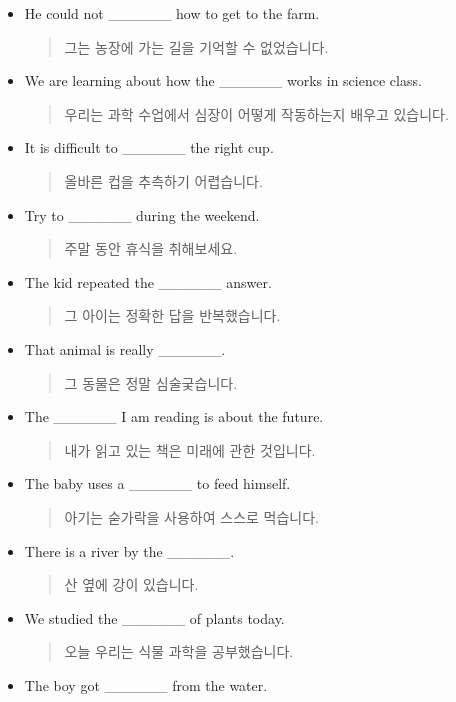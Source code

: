 \documentclass{article}
\begin{document}
\begin{addmargin}[1em]{1em}
\begin{itemize}
\begin{quote}
    \end{quote}
    \item He could not \_\_\_\_\_\_ how to get to the farm.
    \begin{quote}
    그는 농장에 가는 길을 기억할 수 없었습니다.
    \end{quote}
    \newpage
    \item We are learning about how the \_\_\_\_\_\_ works in science class.
    \begin{quote}
    우리는 과학 수업에서 심장이 어떻게 작동하는지 배우고 있습니다.
    \end{quote}
    \item It is difficult to \_\_\_\_\_\_ the right cup.
    \begin{quote}
    올바른 컵을 추측하기 어렵습니다.
    \end{quote}
    \item Try to \_\_\_\_\_\_ during the weekend.
    \begin{quote}
    주말 동안 휴식을 취해보세요.
    \end{quote}
    \item The kid repeated the \_\_\_\_\_\_ answer.
    \begin{quote}
    그 아이는 정확한 답을 반복했습니다.
    \end{quote}
    \item That animal is really \_\_\_\_\_\_.
    \begin{quote}
    그 동물은 정말 심술궂습니다.
    \end{quote}
    \item The \_\_\_\_\_\_ I am reading is about the future.
    \begin{quote}
    내가 읽고 있는 책은 미래에 관한 것입니다.
    \end{quote}
    \item The baby uses a \_\_\_\_\_\_ to feed himself.
    \begin{quote}
    아기는 숟가락을 사용하여 스스로 먹습니다.
    \end{quote}
    \item There is a river by the \_\_\_\_\_\_.
    \begin{quote}
    산 옆에 강이 있습니다.
    \end{quote}
    \item We studied the \_\_\_\_\_\_ of plants today.
    \begin{quote}
    오늘 우리는 식물 과학을 공부했습니다.
    \end{quote}
    \item The boy got \_\_\_\_\_\_ from the water.

\end{itemize}
\end{addmargin}
\end{document}
